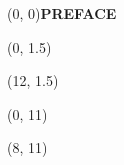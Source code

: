 \documentclass[10pt]{article}
\begin{document}
\begin{textblock}{23}(0, 0)\center\huge\textbf{PREFACE}\end{textblock}

\begin{textblock}{11}(0, 1.5)
    {
    \footnotesize
    {}
    }
\end{textblock}

\begin{textblock}{11}(12, 1.5)
    {
    \footnotesize
    {}
    }
\end{textblock}

\begin{textblock}{6}(0, 11)
    \small
    {}
\end{textblock}

\begin{textblock}{15}(8, 11)
    \footnotesize
    {}
\end{textblock}
\end{document}
